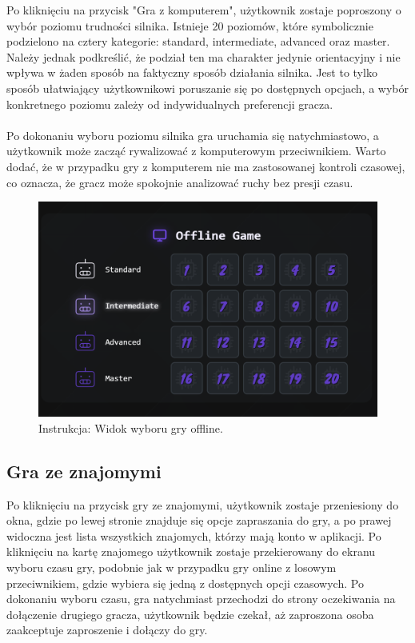 \documentclass[twoside]{projektInzynierskiMS1}
\begin{document}
\noindent
Po kliknięciu na przycisk "Gra z komputerem", użytkownik zostaje poproszony o wybór poziomu trudności silnika. Istnieje 20 poziomów, które symbolicznie podzielono na cztery kategorie: standard, intermediate, advanced oraz master. Należy jednak podkreślić, że podział ten ma charakter jedynie orientacyjny i nie wpływa w żaden sposób na faktyczny sposób działania silnika. Jest to tylko sposób ułatwiający użytkownikowi poruszanie się po dostępnych opcjach, a wybór konkretnego poziomu zależy od indywidualnych preferencji gracza.
\\\\
Po dokonaniu wyboru poziomu silnika gra uruchamia się natychmiastowo, a użytkownik może zacząć rywalizować z komputerowym przeciwnikiem. Warto dodać, że w przypadku gry z komputerem nie ma zastosowanej kontroli czasowej, co oznacza, że gracz może spokojnie analizować ruchy bez presji czasu.

\vspace{0.5cm}
\begin{figure}[h!]
    \centering
    \includegraphics[width=1\textwidth]{images/ins_min_pvc.png}
    \caption{Instrukcja: Widok wyboru gry offline.}
\end{figure}

\newpage

\subsection{Gra ze znajomymi}

\noindent
Po kliknięciu na przycisk gry ze znajomymi, użytkownik zostaje przeniesiony do okna, gdzie po lewej stronie znajduje się opcje zapraszania do gry, a po prawej widoczna jest lista wszystkich znajomych, którzy mają konto w aplikacji. Po kliknięciu na kartę znajomego użytkownik zostaje przekierowany do ekranu wyboru czasu gry, podobnie jak w przypadku gry online z losowym przeciwnikiem, gdzie wybiera się jedną z dostępnych opcji czasowych. Po dokonaniu wyboru czasu, gra natychmiast przechodzi do strony oczekiwania na dołączenie drugiego gracza, użytkownik będzie czekał, aż zaproszona osoba zaakceptuje zaproszenie i dołączy do gry.
\end{document}

